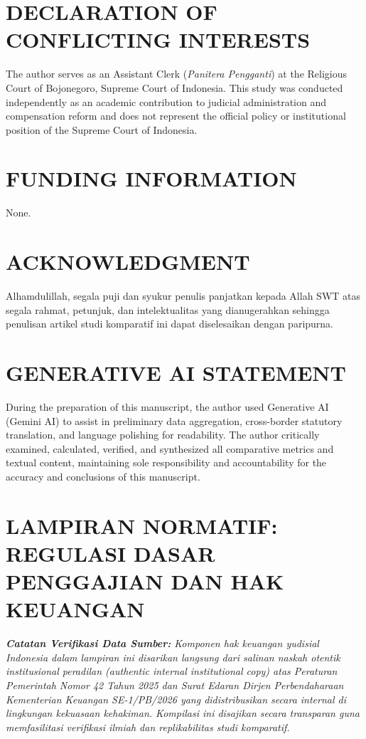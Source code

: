\documentclass[12pt, a4paper]{article}
\begin{document}
\newpage
\section*{DECLARATION OF CONFLICTING INTERESTS}
The author serves as an Assistant Clerk (\textit{Panitera Pengganti}) at the Religious Court of Bojonegoro, Supreme Court of Indonesia. This study was conducted independently as an academic contribution to judicial administration and compensation reform and does not represent the official policy or institutional position of the Supreme Court of Indonesia.

\section*{FUNDING INFORMATION}
None.

\section*{ACKNOWLEDGMENT}
Alhamdulillah, segala puji dan syukur penulis panjatkan kepada Allah SWT atas segala rahmat, petunjuk, dan intelektualitas yang dianugerahkan sehingga penulisan artikel studi komparatif ini dapat diselesaikan dengan paripurna.

\section*{GENERATIVE AI STATEMENT}
During the preparation of this manuscript, the author used Generative AI (Gemini AI) to assist in preliminary data aggregation, cross-border statutory translation, and language polishing for readability. The author critically examined, calculated, verified, and synthesized all comparative metrics and textual content, maintaining sole responsibility and accountability for the accuracy and conclusions of this manuscript.

\newpage
\section*{LAMPIRAN NORMATIF: REGULASI DASAR PENGGAJIAN DAN HAK KEUANGAN}

\noindent\textit{\textbf{Catatan Verifikasi Data Sumber:} Komponen hak keuangan yudisial Indonesia dalam lampiran ini disarikan langsung dari salinan naskah otentik institusional peradilan (\textit{authentic internal institutional copy}) atas Peraturan Pemerintah Nomor 42 Tahun 2025 dan Surat Edaran Dirjen Perbendaharaan Kementerian Keuangan SE-1/PB/2026 yang didistribusikan secara internal di lingkungan kekuasaan kehakiman. Kompilasi ini disajikan secara transparan guna memfasilitasi verifikasi ilmiah dan replikabilitas studi komparatif.}
\end{document}
